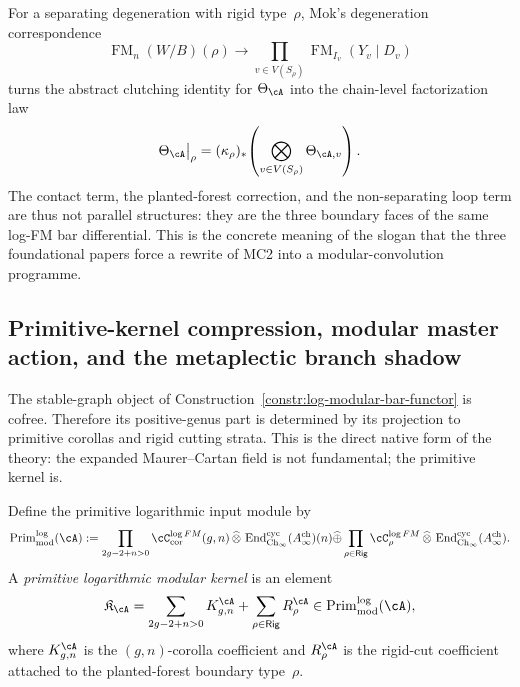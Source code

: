 \begin{remark}
\label{rem:rigid-type-boundary-factorization}
For a separating degeneration with rigid type~$\rho$, Mok's degeneration
correspondence
\[
\operatorname{FM}_n(W/B)(\rho)\longrightarrow
\prod_{v\in V(S_\rho)}
\operatorname{FM}_{I_v}(Y_v\mathbin{|}D_v)
\]
turns the abstract clutching identity for $\Theta_\cA$ into the chain-level
factorization law
\[
\Theta_\cA\big|_{\rho}
=
(\kappa_\rho)_*\!\left(
\bigotimes_{v\in V(S_\rho)}\Theta_{\cA,v}
\right).
\]
The contact term, the planted-forest correction, and the non-separating loop
term are thus not parallel structures: they are the three boundary faces of the
same log-FM bar differential.  This is the concrete meaning of the slogan that
the three foundational papers force a rewrite of MC2 into a modular-convolution
programme.
\end{remark}

\subsection{Primitive-kernel compression, modular master action, and the metaplectic branch shadow}
\label{subsec:primitive-kernel-compression}

The stable-graph object of Construction~\ref{constr:log-modular-bar-functor}
is cofree.  Therefore its positive-genus part is determined by its projection to
primitive corollas and rigid cutting strata.  This is the direct native form of
the theory: the expanded Maurer--Cartan field is not fundamental; the primitive
kernel is.

\begin{definition}
\label{def:primitive-log-modular-kernel}
Define the primitive logarithmic input module by
\[
\operatorname{Prim}^{\log}_{\mathrm{mod}}(\cA)
:=
\prod_{2g-2+n>0}
\cC^{\log FM}_{\mathrm{cor}}(g,n)
\,\widehat\otimes\,
\operatorname{End}^{\mathrm{cyc}}_{\mathrm{Ch}_\infty}(A^{\mathrm{ch}}_\infty)(n)
\widehat\oplus
\prod_{\rho\in \mathsf{Rig}}
\cC^{\log FM}_{\rho}
\,\widehat\otimes\,
\operatorname{End}^{\mathrm{cyc}}_{\mathrm{Ch}_\infty}(A^{\mathrm{ch}}_\infty).
\]
A \emph{primitive logarithmic modular kernel} is an element
\[
\mathfrak K_\cA
=
\sum_{2g-2+n>0}K^{\cA}_{g,n}
+
\sum_{\rho\in\mathsf{Rig}}R^{\cA}_{\rho}
\in
\operatorname{Prim}^{\log}_{\mathrm{mod}}(\cA),
\]
where $K^{\cA}_{g,n}$ is the $(g,n)$-corolla coefficient and
$R^{\cA}_{\rho}$ is the rigid-cut coefficient attached to the planted-forest
boundary type~$\rho$.
\end{definition}

